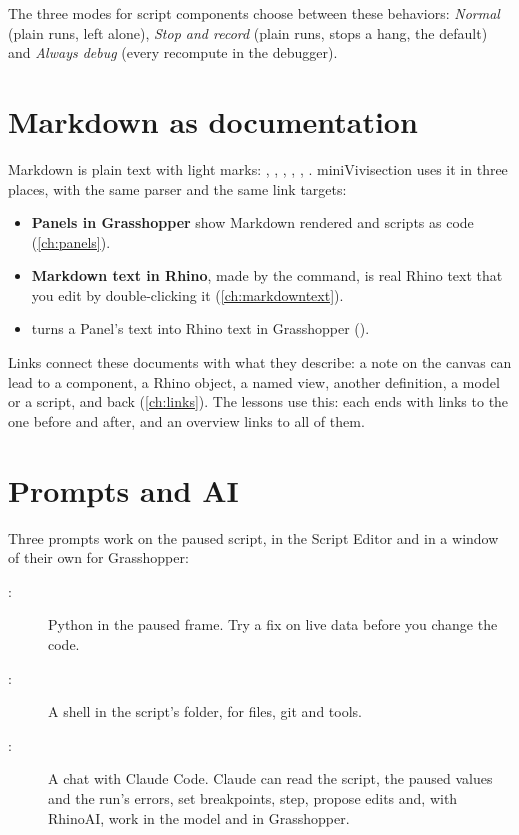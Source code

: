 The three modes for script components choose between these behaviors: \emph{Normal} (plain runs,
left alone), \emph{Stop and record} (plain runs,  stops a hang, the default) and
\emph{Always debug} (every recompute in the debugger).

\section{Markdown as documentation}\label{sec:markdownconcept}

Markdown is plain text with light marks: , , ,
, , . miniVivisection uses it in three places, with the same
parser and the same link targets:

\begin{itemize}
  \item \textbf{Panels in Grasshopper} show Markdown rendered and scripts as code (\cref{ch:panels}).
  \item \textbf{Markdown text in Rhino}, made by the  command, is real Rhino text that
        you edit by double-clicking it (\cref{ch:markdowntext}).
  \item {} turns a Panel's text into Rhino text in Grasshopper ().
\end{itemize}

Links connect these documents with what they describe: a note on the canvas can lead to a
component, a Rhino object, a named view, another definition, a model or a script, and back
(\cref{ch:links}). The lessons use this: each ends with links to the one before and after, and an
overview links to all of them.

\section{Prompts and AI}\label{sec:aiconcept}

Three prompts work on the paused script, in the Script Editor and in a window of their own for
Grasshopper:

\begin{description}
  \item[:] Python in the paused frame. Try a fix on live data before you change the code.
  \item[:] A shell in the script's folder, for files, git and tools.
  \item[:] A chat with Claude Code. Claude can read the script, the paused values and the run's
        errors, set breakpoints, step, propose edits and, with RhinoAI, work in the model and in
        Grasshopper.
\end{description}

